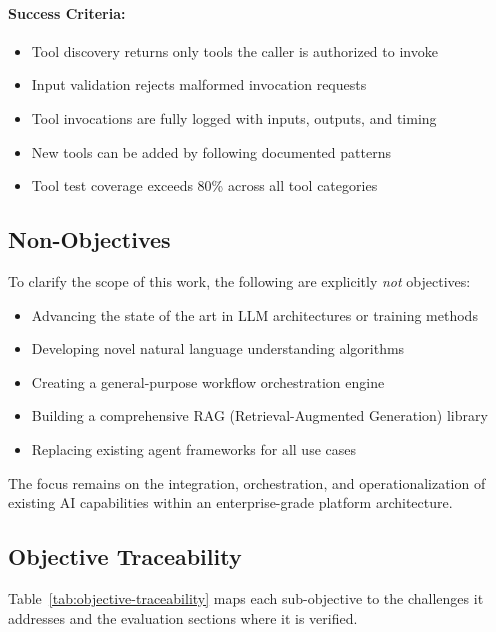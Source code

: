 \paragraph{Success Criteria:}
\begin{itemize}
    \item Tool discovery returns only tools the caller is authorized to invoke
    \item Input validation rejects malformed invocation requests
    \item Tool invocations are fully logged with inputs, outputs, and timing
    \item New tools can be added by following documented patterns
    \item Tool test coverage exceeds 80\% across all tool categories
\end{itemize}

\subsection{Non-Objectives}

To clarify the scope of this work, the following are explicitly \emph{not} objectives:

\begin{itemize}
    \item Advancing the state of the art in LLM architectures or training methods
    \item Developing novel natural language understanding algorithms
    \item Creating a general-purpose workflow orchestration engine
    \item Building a comprehensive RAG (Retrieval-Augmented Generation) library
    \item Replacing existing agent frameworks for all use cases
\end{itemize}

The focus remains on the integration, orchestration, and operationalization of existing AI capabilities within an enterprise-grade platform architecture.

\subsection{Objective Traceability}

Table~\ref{tab:objective-traceability} maps each sub-objective to the challenges it addresses and the evaluation sections where it is verified.

